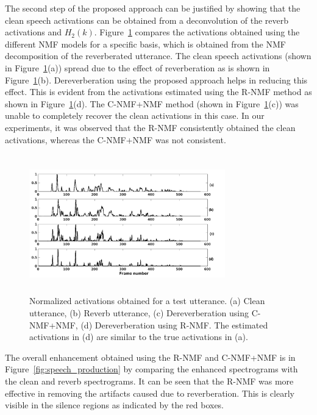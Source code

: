 The second step of the proposed approach can be justified by showing that the clean speech activations can be obtained from a deconvolution of the reverb activations and $H_2(k)$. Figure~\ref{fig:activation_comp} compares the activations obtained using the different NMF models for a specific basis, which is obtained from the NMF decomposition of the reverberated utterance. The clean speech activations (shown in Figure~\ref{fig:activation_comp}(a)) spread due to the effect of reverberation as is shown in Figure~\ref{fig:activation_comp}(b). Dereverberation using the proposed approach helps in reducing this effect. This is evident from the activations estimated using the R-NMF method as shown in Figure~\ref{fig:activation_comp}(d). The C-NMF+NMF method (shown in Figure~\ref{fig:activation_comp}(c)) was unable to completely recover the clean activations in this case. In our experiments, it was observed that the R-NMF consistently obtained the clean activations, whereas the C-NMF+NMF was not consistent. 
\begin{figure}[tbh!]
  \centering
  \includegraphics[width=8.5cm, height=6cm]{fig/activation_comparison4.png}
  \caption{Normalized activations obtained for a test utterance. (a) Clean utterance, (b) Reverb utterance, (c) Dereverberation using C-NMF+NMF, (d) Dereverberation using R-NMF. The estimated activations in (d) are similar to   
the true activations in (a).}
  \label{fig:activation_comp}
\end{figure}
The overall enhancement obtained using the R-NMF and C-NMF+NMF is in Figure~\ref{fig:speech_production} by comparing the enhanced spectrograms with the clean and reverb spectrograms. It can be seen that the R-NMF was more effective in removing the artifacts caused due to reverberation. This is clearly visible in the silence regions as indicated by the red boxes.
